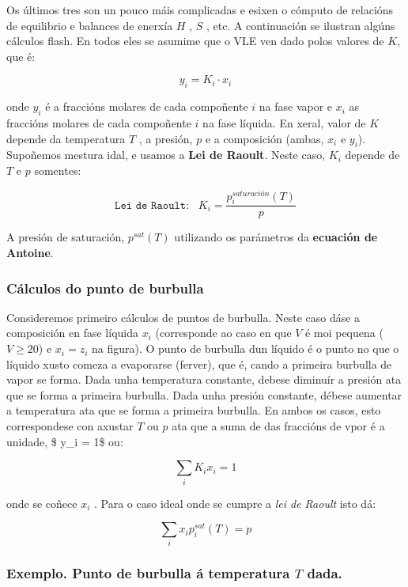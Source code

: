 \documentclass[
  letterpaper,
  DIV=11,
  numbers=noendperiod]{scrartcl}
\begin{document}
Os últimos tres son un pouco máis complicadas e esixen o cómputo de
relacións de equilibrio e balances de enerxía \(H\) , \(S\) , etc. A
continuación se ilustran algúns cálculos flash. En todos eles se asumime
que o VLE ven dado polos valores de \(K\), que é:

\[
y_i = K_i \cdot x_i
\]

onde \(y_i\) é a fraccións molares de cada compoñente \(i\) na fase
vapor e \(x_i\) as fraccións molares de cada compoñente \(i\) na fase
líquida. En xeral, valor de \(K\) depende da temperatura \(T\) , a
presión, \(p\) e a composición (ambas, \(x_i\) e \(y_i\)). Supoñemos
mestura idal, e usamos a \textbf{Lei de Raoult}. Neste caso, \(K_i\)
depende de \(T\) e \(p\) somentes:

\[
\texttt{Lei de Raoult:} \;\;\; K_i = \frac {p^{saturación}_i (T)} {p}
\]

A presión de saturación, \(p^{sat} (T)\) utilizando os parámetros da
\textbf{ecuación de Antoine}.

\subsubsection{Cálculos do punto de
burbulla}\label{cuxe1lculos-do-punto-de-burbulla}

Consideremos primeiro cálculos de puntos de burbulla. Neste caso dáse a
composición en fase líquida \(x_i\) (corresponde ao caso en que \(V\) é
moi pequena (\(V \geq 20\)) e \(x_i = z_i\) na figura). O punto de
burbulla dun líquido é o punto no que o líquido xusto comeza a
evaporarse (ferver), que é, cando a primeira burbulla de vapor se forma.
Dada unha temperatura constante, debese diminuír a presión ata que se
forma a primeira burbulla. Dada unha presión constante, débese aumentar
a temperatura ata que se forma a primeira burbulla. En ambos os casos,
esto correspondese con axustar \(T\) ou \(p\) ata que a suma de das
fraccións de vpor é a unidade, \$ \sum y\_i = 1\$ ou:

\[
\sum_i K_i x_i = 1
\]

onde se coñece \(x_i\) . Para o caso ideal onde se cumpre a \emph{lei de
Raoult} isto dá:

\[
\sum_i x_i p_i^{sat} (T) = p
\]

\subsubsection{\texorpdfstring{Exemplo. Punto de burbulla á temperatura
\(T\)
dada.}{Exemplo. Punto de burbulla á temperatura T dada.}}\label{exemplo.-punto-de-burbulla-uxe1-temperatura-t-dada.}
\end{document}
